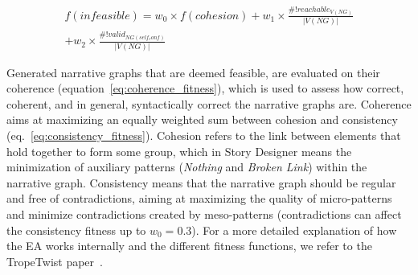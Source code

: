 
\begin{multline}
\label{eq:inf_fitness}
f(infeasible) = w_{0} \times f(cohesion) + w_{1} \times \frac{\#!reachable_{V(NG)}}{|V(NG)|} 
\\ + w_{2} \times  \frac{\#!valid_{NG(self_conf)}}{|V(NG)|}
\end{multline}

Generated narrative graphs that are deemed feasible, are evaluated on their coherence (equation~\ref{eq:coherence_fitness}), which is used to assess how correct, coherent, and in general, syntactically correct the narrative graphs are. Coherence aims at maximizing an equally weighted sum between cohesion and consistency (eq.~\ref{eq:consistency_fitness}). Cohesion refers to the link between elements that hold together to form some group, which in Story Designer means the minimization of auxiliary patterns (\textit{Nothing} and \textit{Broken Link}) within the narrative graph. Consistency means that the narrative graph should be regular and free of contradictions, aiming at maximizing the quality of micro-patterns and minimize contradictions created by meso-patterns (contradictions can affect the consistency fitness up to $w_{0}=0.3$). For a more detailed explanation of how the EA works internally and the different fitness functions, we refer to the TropeTwist paper~\cite{p11alvarez_tropetwist_2022}.



